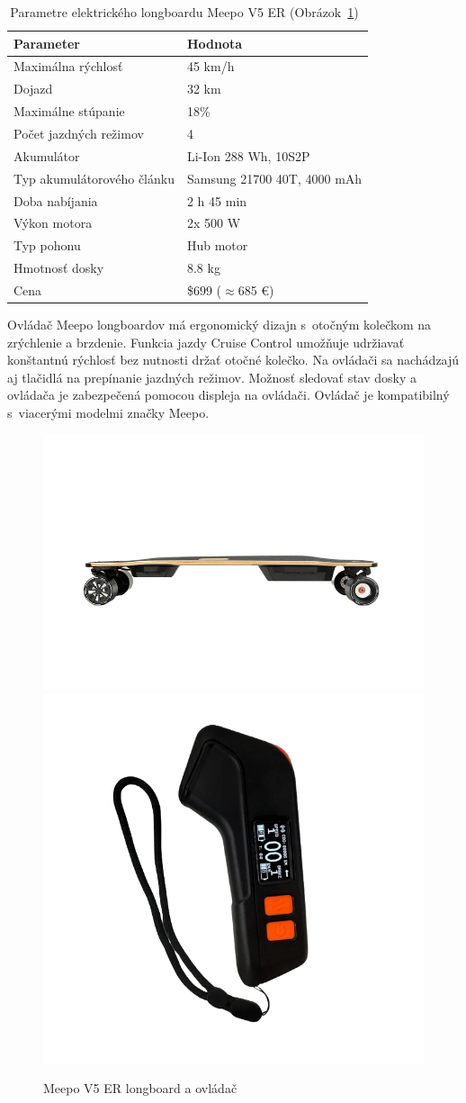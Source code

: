 \begin{table}[h]
    \centering
    \begin{tabular}{|l|l|}
        \hline
        \textbf{Parameter} & \textbf{Hodnota} \\ \hline
        Maximálna rýchlosť & 45 km/h \\ \hline
        Dojazd & 32 km \\ \hline
        Maximálne stúpanie & 18\% \\ \hline
        Počet jazdných režimov & 4 \\ \hline
        Akumulátor & Li-Ion 288 Wh, 10S2P \\ \hline
        Typ akumulátorového článku & Samsung 21700 40T, 4000 mAh \\ \hline
        Doba nabíjania & 2 h 45 min \\ \hline
        Výkon motora & 2x 500 W \\ \hline
        Typ pohonu & Hub motor \\ \hline
        Hmotnosť dosky & 8.8 kg \\ \hline
        Cena & \$699 ($\approx$685 €) \\ \hline
    \end{tabular}
    \caption{Parametre elektrického longboardu Meepo V5 ER (Obrázok~\ref{fig:meepo})~\cite{Meepo}}\label{tab:meepo}
\end{table}

Ovládač Meepo longboardov má ergonomický dizajn s~otočným kolečkom na zrýchlenie a brzdenie.
Funkcia jazdy Cruise Control umožňuje udržiavať konštantnú rýchlosť bez nutnosti držať otočné kolečko.
Na ovládači sa nachádzajú aj tlačidlá na prepínanie jazdných režimov.
Možnosť sledovať stav dosky a ovládača je zabezpečená pomocou displeja na ovládači.
Ovládač je kompatibilný s~viacerými modelmi značky Meepo.

\begin{figure}[h]
    \centering
    \includegraphics[width=0.48\linewidth]{figures/brand-reviews/meepo-longboard.png}\hfill
    \includegraphics[width=0.48\linewidth]{figures/brand-reviews/meepo-controller.png}
    \caption{Meepo V5 ER longboard a ovládač\cite{Meepo}}\label{fig:meepo}
\end{figure}

